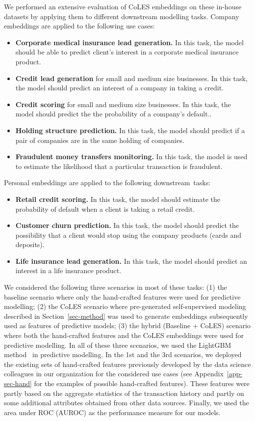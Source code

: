 \documentclass[sigconf]{acmart}
\begin{document}
We performed an extensive evaluation of CoLES embeddings on these in-house datasets by applying them to different downstream modelling tasks.
Company embeddings are applied to the following use cases:
\begin{itemize}
    \item \textbf{Corporate medical insurance lead generation.} In this task, the model should be able to predict client's interest in a corporate medical insurance product.
    \item \textbf{Credit lead generation} for small and medium size businesses. In this task, the model should predict an interest of a company in taking a credit.
    \item \textbf{Credit scoring} for small and medium size businesses. In this task, the model should predict the the probability of a company's default..
    \item \textbf{Holding structure prediction.} In this task, the model should predict if a pair of companies are in the same holding of companies.
    \item \textbf{Fraudulent money transfers monitoring.} In this task, the model is used to estimate the likelihood that a particular transaction is fraudulent.
\end{itemize}
Personal embeddings are applied to the following downstream~tasks:
\begin{itemize}
    \item \textbf{Retail credit scoring.} In this task, the model should estimate the probability of default when a client is taking a retail credit.
    \item \textbf{Customer churn prediction.} In this task, the model should predict the possibility that a client would stop using the company products (cards and deposits).
    \item \textbf{Life insurance lead generation.} In this task, the model should predict an interest in a life insurance product.
\end{itemize}


We considered the following three scenarios in most of these tasks: (1) the baseline scenario where only the hand-crafted features were used for predictive modelling; (2) the CoLES scenario where pre-generated self-supervised modeling described in Section~\ref{sec-method} was used to generate embeddings subsequently used as features of predictive models; (3) the hybrid (Baseline + CoLES) scenario where both the hand-crafted features and the CoLES embeddings were used for predictive modelling. In all of these three scenarios, we used the LightGBM method~\citep{Ke2017LightGBMAH} in predictive modelling.
In the 1st and the 3rd scenarios, we deployed the existing sets of hand-crafted features previously developed by the data science colleagues in our organization for the considered use cases (see Appendix~\ref{app-sec-hand} for the examples of  possible hand-crafted features).
These features were partly based on the aggregate statistics of the transaction history and partly on some additional attributes obtained from other data sources.
Finally, we used the area under ROC (AUROC) as the performance measure for our models.
\end{document}
